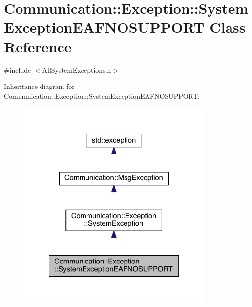 \hypertarget{class_communication_1_1_exception_1_1_system_exception_e_a_f_n_o_s_u_p_p_o_r_t}{}\section{Communication\+:\+:Exception\+:\+:System\+Exception\+E\+A\+F\+N\+O\+S\+U\+P\+P\+O\+R\+T Class Reference}
\label{class_communication_1_1_exception_1_1_system_exception_e_a_f_n_o_s_u_p_p_o_r_t}


{\ttfamily \#include $<$All\+System\+Exceptions.\+h$>$}



Inheritance diagram for Communication\+:\+:Exception\+:\+:System\+Exception\+E\+A\+F\+N\+O\+S\+U\+P\+P\+O\+R\+T\+:\nopagebreak
\begin{figure}[H]
\begin{center}
\leavevmode
\includegraphics[width=278pt]{class_communication_1_1_exception_1_1_system_exception_e_a_f_n_o_s_u_p_p_o_r_t__inherit__graph}
\end{center}
\end{figure}


